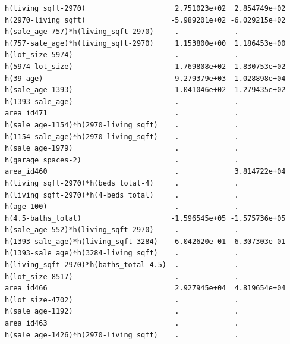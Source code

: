 \documentclass[
]{article}
\begin{document}
\begin{verbatim}
h(living_sqft-2970)                     2.751023e+02  2.854749e+02
h(2970-living_sqft)                    -5.989201e+02 -6.029215e+02
h(sale_age-757)*h(living_sqft-2970)     .             .           
h(757-sale_age)*h(living_sqft-2970)     1.153800e+00  1.186453e+00
h(lot_size-5974)                        .             .           
h(5974-lot_size)                       -1.769808e+02 -1.830753e+02
h(39-age)                               9.279379e+03  1.028898e+04
h(sale_age-1393)                       -1.041046e+02 -1.279435e+02
h(1393-sale_age)                        .             .           
area_id471                              .             .           
h(sale_age-1154)*h(2970-living_sqft)    .             .           
h(1154-sale_age)*h(2970-living_sqft)    .             .           
h(sale_age-1979)                        .             .           
h(garage_spaces-2)                      .             .           
area_id460                              .             3.814722e+04
h(living_sqft-2970)*h(beds_total-4)     .             .           
h(living_sqft-2970)*h(4-beds_total)     .             .           
h(age-100)                              .             .           
h(4.5-baths_total)                     -1.596545e+05 -1.575736e+05
h(sale_age-552)*h(living_sqft-2970)     .             .           
h(1393-sale_age)*h(living_sqft-3284)    6.042620e-01  6.307303e-01
h(1393-sale_age)*h(3284-living_sqft)    .             .           
h(living_sqft-2970)*h(baths_total-4.5)  .             .           
h(lot_size-8517)                        .             .           
area_id466                              2.927945e+04  4.819654e+04
h(lot_size-4702)                        .             .           
h(sale_age-1192)                        .             .           
area_id463                              .             .           
h(sale_age-1426)*h(2970-living_sqft)    .             .           
                                                                  

\end{verbatim}
\end{document}
